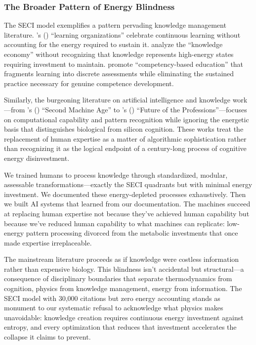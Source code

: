 \subsubsection{The Broader Pattern of Energy Blindness}

The SECI model exemplifies a pattern pervading knowledge management literature. \citeauthor{senge1990}'s (\citeyear{senge1990}) ``learning organizations'' celebrate continuous learning without accounting for the energy required to sustain it. \citet{powell2004knowledge} analyze the ``knowledge economy'' without recognizing that knowledge represents high-energy states requiring investment to maintain. \citet{mulder2007competency} promote ``competency-based education'' that fragments learning into discrete assessments while eliminating the sustained practice necessary for genuine competence development.

Similarly, the burgeoning literature on artificial intelligence and knowledge work---from \citeauthor{brynjolfsson2014second}'s (\citeyear{brynjolfsson2014second}) ``Second Machine Age'' to \citeauthor{susskind2020future}'s (\citeyear{susskind2020future}) ``Future of the Professions''---focuses on computational capability and pattern recognition while ignoring the energetic basis that distinguishes biological from silicon cognition. These works treat the replacement of human expertise as a matter of algorithmic sophistication rather than recognizing it as the logical endpoint of a century-long process of cognitive energy disinvestment.

We trained humans to process knowledge through standardized, modular, assessable transformations---exactly the SECI quadrants but with minimal energy investment. We documented these energy-depleted processes exhaustively. Then we built AI systems that learned from our documentation. The machines succeed at replacing human expertise not because they've achieved human capability but because we've reduced human capability to what machines can replicate: low-energy pattern processing divorced from the metabolic investments that once made expertise irreplaceable.

The mainstream literature proceeds as if knowledge were costless information rather than expensive biology. This blindness isn't accidental but structural---a consequence of disciplinary boundaries that separate thermodynamics from cognition, physics from knowledge management, energy from information. The SECI model with 30,000 citations but zero energy accounting stands as monument to our systematic refusal to acknowledge what physics makes unavoidable: knowledge creation requires continuous energy investment against entropy, and every optimization that reduces that investment accelerates the collapse it claims to prevent.

